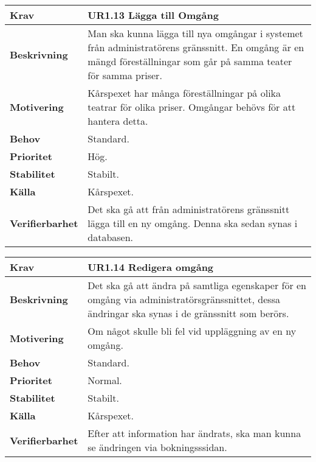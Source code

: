 \documentclass[a4paper, twoside, 11pt, titlepage]{article}
\begin{document}
		\begin {table} [ht] \begin{tabular} { p{2.6cm} p{12.5cm} }
			\hline
			{\sffamily\textbf{Krav}} & {\sffamily\textbf{UR1.13 Lägga till Omgång }} \\
			\hline
			{\sffamily\textbf{Beskrivning}} & {Man ska kunna lägga till nya omgångar i systemet från administratörens gränssnitt. En omgång är en mängd föreställningar som går på samma teater för samma priser.} \\
			\hline
			{\sffamily\textbf{Motivering}} & {Kårspexet har många föreställningar på olika teatrar för olika priser. Omgångar behövs för att hantera detta.} \\
			\hline
			{\sffamily\textbf{Behov}} & {Standard.} \\
			\hline
			{\sffamily\textbf{Prioritet}} & {Hög.} \\
			\hline
			{\sffamily\textbf{Stabilitet}} & {Stabilt.} \\
			\hline
			{\sffamily\textbf{Källa}} & {Kårspexet.} \\
			\hline
			{\sffamily\textbf{Verifierbarhet}} & {Det ska gå att från administratörens gränssnitt lägga till en ny omgång. Denna ska sedan synas i databasen.} \\
			\hline
		\end{tabular} \end{table} \FloatBarrier
		\vspace{6mm}

		\begin {table} [ht] \begin{tabular} { p{2.6cm} p{12.5cm} }
			\hline
			{\sffamily\textbf{Krav}} & {\sffamily\textbf{UR1.14 Redigera omgång }} \\
			\hline
			{\sffamily\textbf{Beskrivning}} & {Det ska gå att ändra på samtliga egenskaper för en omgång via administratörsgränssnittet, dessa ändringar ska synas i de gränssnitt som berörs.} \\
			\hline
			{\sffamily\textbf{Motivering}} & {Om något skulle bli fel vid uppläggning av en ny omgång.} \\
			\hline
			{\sffamily\textbf{Behov}} & {Standard.} \\
			\hline
			{\sffamily\textbf{Prioritet}} & {Normal.} \\
			\hline
			{\sffamily\textbf{Stabilitet}} & {Stabilt.} \\
			\hline
			{\sffamily\textbf{Källa}} & {Kårspexet.} \\
			\hline
			{\sffamily\textbf{Verifierbarhet}} & {Efter att information har ändrats, ska man kunna se ändringen via bokningsssidan.} \\
			\hline
		\end{tabular} \end{table} \FloatBarrier
\end{document}
